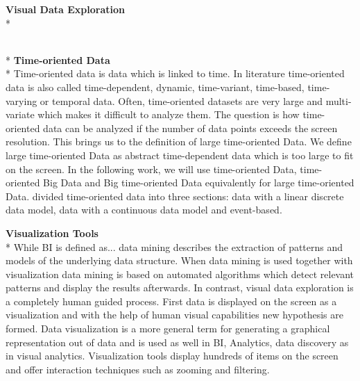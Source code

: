 \textbf{Visual Data Exploration}\\*

\\*
\textbf{Time-oriented Data}\\*
Time-oriented data is data which is linked to time\cite{Aigner2011}. In literature time-oriented data is also called time-dependent, dynamic, time-variant, time-based, time-varying or temporal data\cite{Moere2004}. Often, time-oriented datasets are very large and multi-variate which makes it difficult to analyze them. The question is how time-oriented data can be analyzed if the number of data points exceeds the screen resolution. This brings us to the definition of large time-oriented Data. 
We define large time-oriented Data as abstract time-dependent data which is too large to fit on the screen. \cite{Shneiderman2008} 
In the following work, we will use time-oriented Data, time-oriented Big Data and Big time-oriented Data equivalently for large time-oriented Data.
\cite{Bacic2013} divided time-oriented data into three sections: data with a linear discrete data model, data with a continuous data model and event-based.




\textbf{Visualization Tools}\\*
While BI is defined as... data mining describes the extraction of patterns and models of the underlying data structure\cite{FerreiradeOliveira2003}. When data mining is used together with visualization data mining is based on automated algorithms which detect relevant patterns and display the results afterwards. In contrast, visual data exploration is a completely human guided process\cite{FerreiradeOliveira2003}. First data is displayed on the screen as a visualization and with the help of human visual capabilities new hypothesis are formed. Data visualization is a more general term for generating a graphical representation out of data and is used as well in BI, Analytics, data discovery as in visual analytics. 
Visualization tools display hundreds of items on the screen and offer interaction techniques such as zooming and filtering\cite{Shneiderman2008}.


